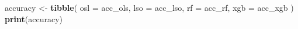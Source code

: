 \documentclass[
]{article}
\newenvironment{Shaded}{\begin{snugshade}}{\end{snugshade}}
\newcommand{\AttributeTok}[1]{\textcolor[rgb]{0.13,0.29,0.53}{#1}}
\newcommand{\FunctionTok}[1]{\textcolor[rgb]{0.13,0.29,0.53}{\textbf{#1}}}
\newcommand{\NormalTok}[1]{#1}
\newcommand{\OtherTok}[1]{\textcolor[rgb]{0.56,0.35,0.01}{#1}}
\begin{document}
\begin{Shaded}
\begin{Highlighting}[]
\NormalTok{accuracy }\OtherTok{\textless{}{-}} \FunctionTok{tibble}\NormalTok{(}
  \AttributeTok{osl =}\NormalTok{ acc\_ols,}
  \AttributeTok{lso =}\NormalTok{ acc\_lso,}
  \AttributeTok{rf =}\NormalTok{ acc\_rf,}
  \AttributeTok{xgb =}\NormalTok{ acc\_xgb}
\NormalTok{)}
\FunctionTok{print}\NormalTok{(accuracy)}
\end{Highlighting}
\end{Shaded}
\end{document}
